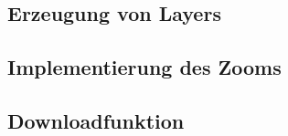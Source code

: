 \subsection{Erzeugung von Layers}
















\subsection{Implementierung des Zooms}

\subsection{Downloadfunktion}















